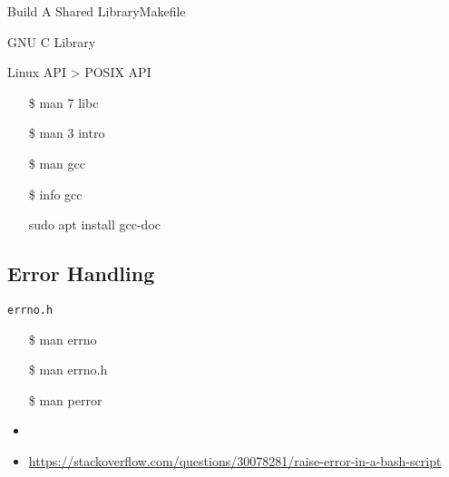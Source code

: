 \begin{frame}{Build A Shared Library}{Makefile}
  \begin{center}
  \end{center}
\end{frame}

\begin{frame}{GNU C Library}
  \begin{minipage}{.55\linewidth}
    Linux API > POSIX API
    \ttfamily
    \begin{itemize}
    \item[\$] man 7 libc
    \item[\$] man 3 intro
    \item[\$] man gcc
    \item[\$] info gcc
    \item[\debian] sudo apt install gcc-doc
    \end{itemize}
  \end{minipage}
  \begin{minipage}{.4\linewidth}
    \begin{center}
    \end{center}
  \end{minipage}
\end{frame}

\subsection{Error Handling}
\label{sec:error-handling}

\begin{frame}{\texttt{errno.h}}
  \begin{center}
  \end{center}\ttfamily
  \begin{itemize}
  \item[\$] man errno
  \item[\$] man errno.h
  \item[\$] man perror
  \end{itemize}
\end{frame}

\begin{itemize}
\item {}
\item \url{https://stackoverflow.com/questions/30078281/raise-error-in-a-bash-script}
\end{itemize}


